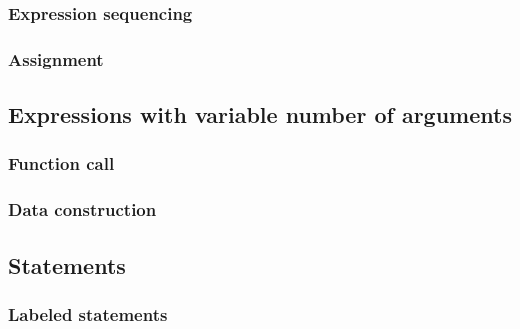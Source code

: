 \documentclass[a4paper,12pt]{article}
\begin{document}
\subsubsection{Expression sequencing}

\subsubsection{Assignment}


\subsection{Expressions with variable number of arguments}
\label{sec:interface:var-args-expr}

\subsubsection{Function call}


\subsubsection{Data construction}



\subsection{Statements}

\subsubsection{Labeled statements}

\end{document}
